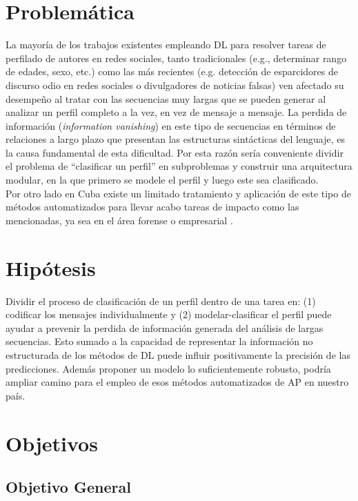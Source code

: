\section*{Problemática}

La mayoría de los trabajos existentes empleando DL para resolver tareas de perfilado de autores en redes sociales, tanto tradicionales (e.g., determinar rango de edades, sexo, etc.) como las más recientes (e.g. detección de esparcidores de discurso odio en redes sociales o divulgadores de noticias falsas) ven afectado su desempeño al tratar con las secuencias muy largas que se pueden generar al analizar un perfil completo a la vez, en vez de mensaje a mensaje. La perdida de información (\textit{information vanishing}) en este tipo de secuencias en términos de relaciones a largo plazo que presentan las estructuras sintácticas del lenguaje, es la causa fundamental de esta dificultad. Por esta razón sería conveniente dividir el problema de ``clasificar un perfil'' en subproblemas y construir una arquitectura modular, en la que primero se modele el perfil y luego este sea clasificado.
\\
Por otro lado en Cuba existe un limitado tratamiento y aplicación de este tipo de métodos automatizados para llevar acabo tareas de impacto como las mencionadas, ya sea en el área forense o empresarial .

\section*{Hipótesis}


Dividir el proceso de clasificación de un perfil dentro de una tarea en: (1) codificar los mensajes individualmente y (2) modelar-clasificar el perfil puede ayudar a prevenir la perdida de información generada del análisis de largas secuencias. Esto sumado a la capacidad de representar la información no estructurada de los métodos de DL puede influir positivamente la precisión de las predicciones.  Además proponer un modelo lo suficientemente robusto, podría ampliar camino para el empleo de esos métodos automatizados  de AP en nuestro país.
\clearpage
{}
\section*{Objetivos}
\subsection*{Objetivo General}

